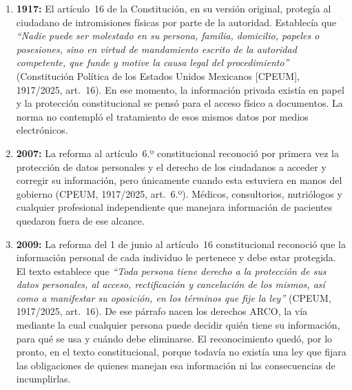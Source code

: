 \documentclass[12pt, a4paper]{article}
\begin{document}
\begin{enumerate}[label=\Roman*.]
 
  \item \textbf{1917:} El artículo~16 de la Constitución, en su
  versión original, protegía al ciudadano de intromisiones físicas
  por parte de la autoridad. Establecía que \textit{``Nadie puede ser
  molestado en su persona, familia, domicilio, papeles o posesiones,
  sino en virtud de mandamiento escrito de la autoridad competente,
  que funde y motive la causa legal del procedimiento''} (Constitución
  Política de los Estados Unidos Mexicanos [CPEUM], 1917/2025,
  art.~16). En ese momento, la información privada existía en papel
  y la protección constitucional se pensó para el acceso físico a
  documentos. La norma no contempló el tratamiento de esos mismos datos
  por medios electrónicos.
 
  \item \textbf{2007:} La reforma al artículo~6.º constitucional
  reconoció por primera vez la protección de datos personales y el
  derecho de los ciudadanos a acceder y corregir su información,
  pero únicamente cuando esta estuviera en manos del gobierno (CPEUM,
  1917/2025, art.~6.º). Médicos, consultorios, nutriólogos y cualquier
  profesional independiente que manejara información de pacientes
  quedaron fuera de ese alcance.
 
  \item \textbf{2009:} La reforma del 1 de junio al artículo~16
  constitucional reconoció que la información personal de cada
  individuo le pertenece y debe estar protegida. El texto establece
  que \textit{``Toda persona tiene derecho a la protección de sus
  datos personales, al acceso, rectificación y cancelación de los
  mismos, así como a manifestar su oposición, en los términos que
  fije la ley''} (CPEUM, 1917/2025, art.~16). De ese párrafo nacen
  los derechos ARCO, la vía mediante la cual cualquier persona puede
  decidir quién tiene su información, para qué se usa y cuándo debe
  eliminarse. El reconocimiento quedó, por lo pronto, en el texto
  constitucional, porque todavía no existía una ley que fijara las
  obligaciones de quienes manejan esa información ni las
  consecuencias de incumplirlas.
 

\end{enumerate}
\end{document}
